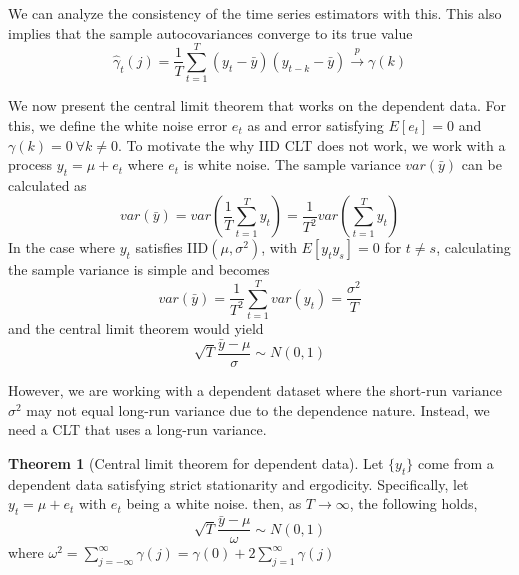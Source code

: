 \documentclass[12pt]{article}
\theoremstyle{definition}
\theoremstyle{property}
\theoremstyle{assumption}
\theoremstyle{example}
\theoremstyle{comment}
\newtheorem{theorem}{Theorem}[section]
\begin{document}
We can analyze the consistency of the time series estimators with this. This also implies that the sample autocovariances converge to its true value
\[
\widehat{\gamma}_t(j)=\frac{1}{T}\sum_{t=1}^T (y_t-\bar{y})(y_{t-k}-\bar{y})\xrightarrow{p} \gamma(k)
\]
\par
We now present the central limit theorem that works on the dependent data. For this, we define the white noise error $e_t$ as and error satisfying $E[e_t]=0$ and $\gamma(k)=0 \ \forall k\neq0$. To motivate the why IID CLT does not work, we work with a process $y_t = \mu + e_t$ where $e_t$ is white noise. The sample variance $var(\bar{y})$ can be calculated as
\[
var(\bar{y})=var\left(\frac{1}{T}\sum_{t=1}^T y_t\right)
=\frac{1}{T^2}var\left(\sum_{t=1}^T y_t\right)
\]
In the case where $y_t$ satisfies IID$(\mu, \sigma^2)$, with $E[y_ty_s]=0$ for $t\neq s$, calculating the sample variance is simple and becomes
\[
var(\bar{y})=\frac{1}{T^2}\sum_{t=1}^Tvar(y_t)=\frac{\sigma^2}{T}
\]
and the central limit theorem would yield
\[
\sqrt{T}\frac{\bar{y}-\mu}{\sigma}\sim N(0,1)
\]
\par
However, we are working with a dependent dataset where the short-run variance $\sigma^2$ may not equal long-run variance due to the dependence nature. Instead, we need a CLT that uses a long-run variance. 
\begin{mdframed}[backgroundcolor=green!5] 
\begin{theorem}[Central limit theorem for dependent data]
Let $\{y_t\}$ come from a dependent data satisfying strict stationarity and ergodicity. Specifically, let $y_t = \mu + e_t$ with $e_t$ being a white noise. then, as $T\to\infty$, the following holds, 
\[
\sqrt{T}\frac{\bar{y}-\mu}{\omega}\sim N(0,1)
\]
where $\omega^2= \sum_{j=-\infty}^\infty \gamma(j)=\gamma(0)+2\sum_{j=1}^\infty \gamma(j)$
\end{theorem}
\end{mdframed}
\end{document}
